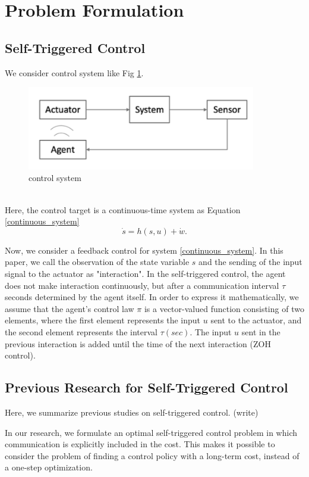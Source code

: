 \documentclass[english, dvipdfmx]{ampmt}             %
\begin{document}
\section{Problem Formulation}
\subsection{Self-Triggered Control}
We consider control system like Fig \ref{image}.
\begin{figure}[h]
	\centering
 	\includegraphics[width=10cm]{event.png}
 	\caption{control system} \label{image}
\end{figure}\\
Here, the control target is a continuous-time system as Equation \eqref{continuous_system}
\begin{equation}
	\dot{s} = h(s,u) + \dot{w}\label{continuous_system}.
\end{equation}\par
Now, we consider a feedback control for system \eqref{continuous_system}. In this paper, we call the observation of the state variable $s$ and the sending of the input signal to the actuator as "interaction". In the self-triggered control, the agent does not make interaction continuously, but after a communication interval $\tau$ seconds determined by the agent itself. In order to express it mathematically, we assume that the agent's control law $\pi$ is a vector-valued function consisting of two elements, where the first element represents the input $u$ sent to the actuator, and the second element represents the interval $\tau (sec)$. The input $u$ sent in the previous interaction is added until the time of the next interaction (ZOH control).

\subsection{Previous Research for Self-Triggered Control}
Here, we summarize previous studies on self-triggered control. 
(write)\par
In our research, we formulate an optimal self-triggered control problem in which communication is explicitly included in the cost. This makes it possible to consider the problem of finding a control policy with a long-term cost, instead of a one-step optimization.
\end{document}
